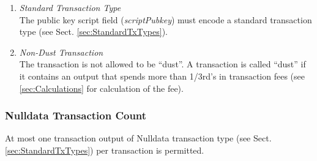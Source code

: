 \begin{enumerate}[label=\arabic*), leftmargin=1cm]
\item \textit{Standard Transaction Type}~\\The public key script field (\textit{scriptPubkey}) must encode a standard transaction type (see Sect. \ref{sec:StandardTxTypes}).
\item \textit{Non-Dust Transaction}~\\The transaction is not allowed to be ``dust''. A transaction is called ``dust'' if it contains an output that spends more than 1/3rd's in transaction fees (see \ref{sec:Calculations} for calculation of the fee).
\end{enumerate}

\subsubsection*{Nulldata Transaction Count}
At most one transaction output of Nulldata transaction type (see Sect. \ref{sec:StandardTxTypes}) per transaction is permitted.